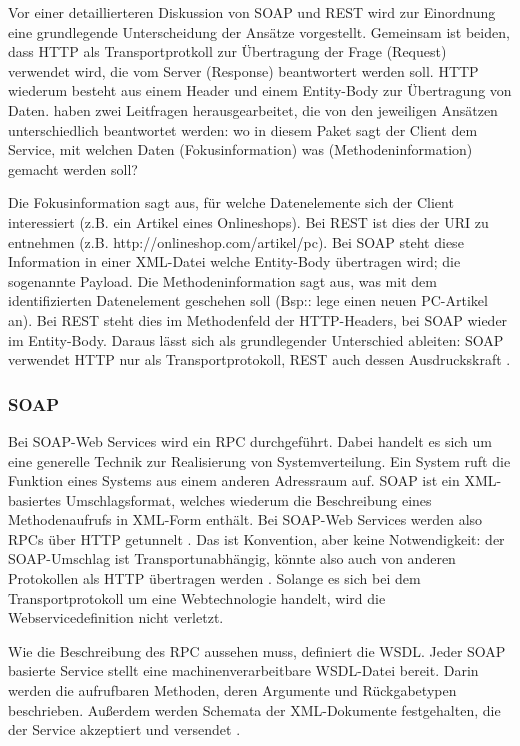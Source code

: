 \documentclass[12pt,a4paper,bibliography=totocnumbered,listof=totoc]{scrartcl}
\begin{document}
Vor einer detaillierteren Diskussion von SOAP und REST wird zur Einordnung eine grundlegende Unterscheidung der Ansätze vorgestellt. Gemeinsam ist beiden, dass HTTP als Transportprotkoll zur Übertragung der Frage (Request) verwendet wird, die vom Server (Response) beantwortert werden soll. HTTP wiederum besteht aus einem Header und einem Entity-Body zur Übertragung von Daten. \citet{richardson07} haben zwei Leitfragen herausgearbeitet, die von den jeweiligen Ansätzen unterschiedlich beantwortet werden: wo in diesem Paket sagt der Client dem Service, mit welchen Daten (Fokusinformation) was (Methodeninformation) gemacht werden soll?

Die Fokusinformation sagt aus, für welche Datenelemente sich der Client interessiert (z.B. ein Artikel eines Onlineshops). Bei REST ist dies der URI zu entnehmen (z.B. http://onlineshop.com/artikel/pc). Bei SOAP steht diese Information in einer XML-Datei welche Entity-Body übertragen wird; die sogenannte Payload. Die Methodeninformation sagt aus, was mit dem identifizierten Datenelement geschehen soll (Bsp:: lege einen neuen PC-Artikel an). Bei REST steht dies im Methodenfeld der HTTP-Headers, bei SOAP wieder im Entity-Body. Daraus lässt sich als grundlegender Unterschied ableiten: SOAP verwendet HTTP nur als Transportprotokoll, REST auch dessen Ausdruckskraft \citep{wilde11}.

\subsubsection{SOAP}
Bei SOAP-Web Services wird ein \ac{RPC} durchgeführt. Dabei handelt es sich um eine generelle Technik zur Realisierung von Systemverteilung. Ein System ruft die Funktion eines Systems aus einem anderen Adressraum auf. SOAP ist ein XML-basiertes Umschlagsformat, welches wiederum die Beschreibung eines Methodenaufrufs in XML-Form enthält. Bei SOAP-Web Services werden also \ac{RPC}s über HTTP getunnelt \citep{wilde11}. Das ist Konvention, aber keine Notwendigkeit: der SOAP-Umschlag ist Transportunabhängig, könnte also auch von anderen Protokollen als HTTP übertragen werden \citep{tilkov11}. Solange es sich bei dem Transportprotokoll um eine Webtechnologie handelt, wird die Webservicedefinition nicht verletzt.

Wie die Beschreibung des \ac{RPC} aussehen muss, definiert die \ac{WSDL}. Jeder SOAP basierte Service stellt eine machinenverarbeitbare \ac{WSDL}-Datei bereit. Darin werden die aufrufbaren Methoden, deren Argumente und Rückgabetypen beschrieben. Außerdem werden Schemata der XML-Dokumente festgehalten, die der Service akzeptiert und versendet \citep{richardson07}.
\end{document}
